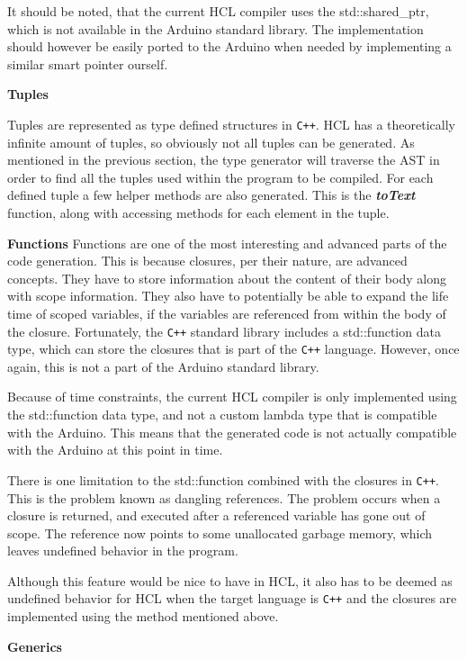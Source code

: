 It should be noted, that the current HCL compiler uses the std::shared\_ptr, which is not available in the Arduino standard library.
The implementation should however be easily ported to the Arduino when needed by implementing a similar smart pointer ourself.

\textbf{Tuples}

Tuples are represented as type defined structures in \texttt{C++}.
HCL has a theoretically infinite amount of tuples, so obviously not all tuples can be generated.
As mentioned in the previous section, the type generator will traverse the AST in order to find all the tuples used within the program to be compiled.
For each defined tuple a few helper methods are also generated.
This is the \textit{\textbf{toText}} function, along with accessing methods for each element in the tuple.

\textbf{Functions}
\label{sec:cplusplusfunctions}
Functions are one of the most interesting and advanced parts of the code generation.
This is because closures, per their nature, are advanced concepts.
They have to store information about the content of their body along with scope information.
They also have to potentially be able to expand the life time of scoped variables, if the variables are referenced from within the body of the closure.
Fortunately, the \texttt{C++} standard library includes a std::function data type, which can store the closures that is part of the \texttt{C++} language.
However, once again, this is not a part of the Arduino standard library.

Because of time constraints, the current HCL compiler is only implemented using the std::function data type, and not a custom lambda type that is compatible with the Arduino.
This means that the generated code is not actually compatible with the Arduino at this point in time.

There is one limitation to the std::function combined with the closures in \texttt{C++}.
This is the problem known as dangling references.
The problem occurs when a closure is returned, and executed after a referenced variable has gone out of scope.
The reference now points to some unallocated garbage memory, which leaves undefined behavior in the program.

Although this feature would be nice to have in HCL, it also has to be deemed as undefined behavior for HCL when the target language is \texttt{C++} and the closures are implemented using the method mentioned above.

\textbf{Generics}

